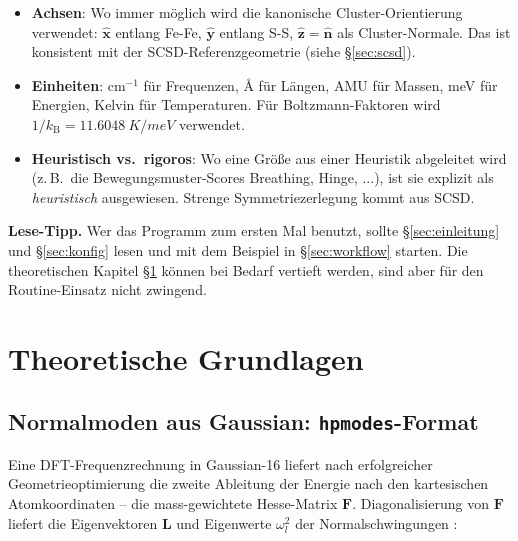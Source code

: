 \documentclass[11pt,a4paper,twoside]{article}
\newcommand{\nhat}{\hat{\mathbf{n}}}
\newcommand{\xhat}{\hat{\mathbf{x}}}
\newcommand{\yhat}{\hat{\mathbf{y}}}
\newcommand{\zhat}{\hat{\mathbf{z}}}
\newcommand{\kB}{k_{\mathrm{B}}}
\theoremstyle{remark}
\begin{document}
\begin{itemize}
  \item \textbf{Achsen}: Wo immer m\"oglich wird die kanonische
        Cluster-Orientierung verwendet:
        $\xhat$ entlang Fe-Fe, $\yhat$ entlang S-S,
        $\zhat = \nhat$ als Cluster-Normale. Das ist konsistent mit
        der SCSD-Referenzgeometrie (siehe \S\ref{sec:scsd}).
  \item \textbf{Einheiten}: cm$^{-1}$ f\"ur Frequenzen,
        \AA{} f\"ur L\"angen, AMU f\"ur Massen, meV f\"ur Energien,
        Kelvin f\"ur Temperaturen. F\"ur Boltzmann-Faktoren wird
        $1/\kB = \SI{11.6048}{K/meV}$ verwendet.
  \item \textbf{Heuristisch vs.\ rigoros}: Wo eine Gr\"o\ss e aus
        einer Heuristik abgeleitet wird (z.\,B.\ die
        Bewegungsmuster-Scores Breathing, Hinge, ...), ist sie
        explizit als \emph{heuristisch} ausgewiesen. Strenge
        Symmetriezerlegung kommt aus SCSD.
\end{itemize}

\begin{infobox}
\textbf{Lese-Tipp.} Wer das Programm zum ersten Mal benutzt, sollte
\S\ref{sec:einleitung} und \S\ref{sec:konfig} lesen und mit dem
Beispiel in \S\ref{sec:workflow} starten. Die theoretischen Kapitel
\S\ref{sec:theorie} k\"onnen bei Bedarf vertieft werden, sind aber f\"ur
den Routine-Einsatz nicht zwingend.
\end{infobox}

\section{Theoretische Grundlagen}
\label{sec:theorie}

\subsection{Normalmoden aus Gaussian: \texttt{hpmodes}-Format}
\label{sec:normalmoden}

Eine DFT-Frequenzrechnung in Gaussian-16 liefert nach erfolgreicher
Geometrieoptimierung die zweite Ableitung der Energie nach den
kartesischen Atomkoordinaten -- die mass-gewichtete Hesse-Matrix
$\mathbf{F}$. Diagonalisierung von $\mathbf{F}$ liefert die
Eigenvektoren $\mathbf{L}$ und Eigenwerte $\omega_l^2$ der
Normalschwingungen \cite{WilsonDeciusCross1955}:
\end{document}
